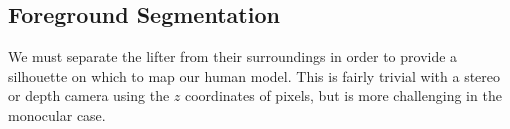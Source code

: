 \subsection{Foreground Segmentation}

We must separate the lifter from their surroundings in order to provide a silhouette on which to map our human model. This is fairly trivial with a stereo or depth camera using the $z$ coordinates of pixels, but is more challenging in the monocular case.



